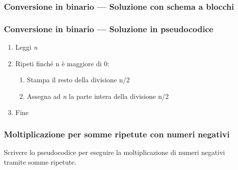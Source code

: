 \documentclass[aspectratio=169,]{beamer}
\begin{document}
\begin{frame}
\frametitle{Conversione in binario --- Soluzione con schema a blocchi}
\centering
{}
\end{frame}

\begin{frame}
\frametitle{Conversione in binario --- Soluzione in pseudocodice}
\begin{enumerate}
	\item Leggi \emph{n}
	\item Ripeti finché n è maggiore di 0:
	\begin{enumerate}
		\item Stampa il resto della divisione n/2
		\item Assegna ad \emph{n} la parte intera della divisione n/2
	\end{enumerate}
	\item Fine
\end{enumerate}
\end{frame}

\begin{frame}
\frametitle{Moltiplicazione per somme ripetute con numeri negativi}
Scrivere lo pseudocodice per eseguire la moltiplicazione di numeri negativi tramite somme ripetute.
\end{frame}
\end{document}

